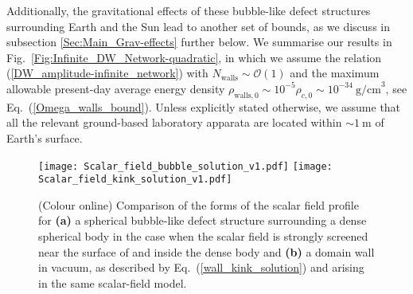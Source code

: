 \documentclass[aps,prd,onecolumn,nofootinbib]{revtex4-2} %
\begin{document}
Additionally, the gravitational effects of these bubble-like defect structures surrounding Earth and the Sun lead to another set of bounds, as we discuss in subsection \ref{Sec:Main_Grav-effects} further below. 
We summarise our results in Fig.~\ref{Fig:Infinite_DW_Network-quadratic}, in which we assume the relation (\ref{DW_amplitude-infinite_network}) with $N_\textrm{walls} \sim \mathcal{O}(1)$ and the maximum allowable present-day average energy density $\rho_{\textrm{walls},0} \sim 10^{-5} \rho_{c,0} \sim 10^{-34}~\textrm{g/cm}^3$, see Eq.~(\ref{Omega_walls_bound}). 
Unless explicitly stated otherwise, we assume that all the relevant ground-based laboratory apparata are located within $\sim 1~\textrm{m}$ of Earth's surface. 





\begin{figure*}[t!]
\centering
\texttt{[image: Scalar\_field\_bubble\_solution\_v1.pdf]}
\hspace{5mm}
\texttt{[image: Scalar\_field\_kink\_solution\_v1.pdf]}
\caption{ \normalsize (Colour online) 
Comparison of the forms of the scalar field profile for 
\textbf{(a)} a spherical bubble-like defect structure surrounding a dense spherical body in the case when the scalar field is strongly screened near the surface of and inside the dense body 
and \textbf{(b)} a domain wall in vacuum, as described by Eq.~(\ref{wall_kink_solution}) and arising in the same scalar-field model. 
}
\label{Fig:Scalar-field_profiles_comparison}
\end{figure*}
\end{document}
